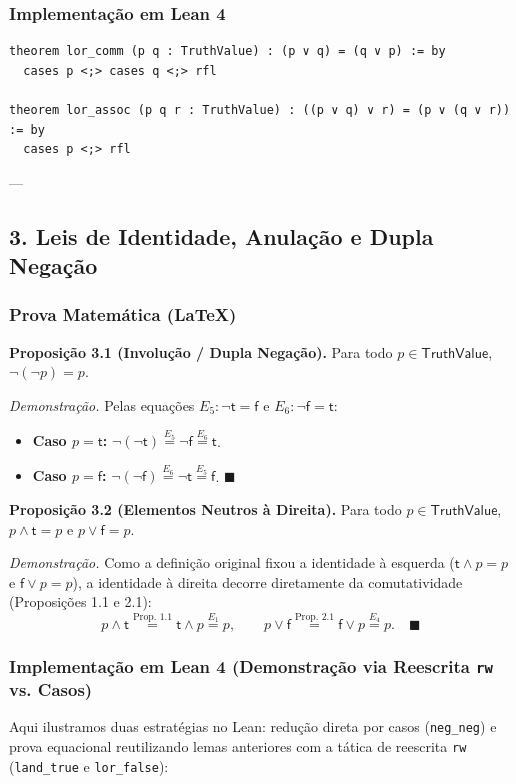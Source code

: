 \documentclass[11pt,a4paper]{scrartcl}
\begin{document}
\subsubsection{Implementação em Lean 4}
\label{sec:org64135f1}
\begin{lstlisting}[language=lean4,numbers=none]
theorem lor_comm (p q : TruthValue) : (p ∨ q) = (q ∨ p) := by
  cases p <;> cases q <;> rfl

theorem lor_assoc (p q r : TruthValue) : ((p ∨ q) ∨ r) = (p ∨ (q ∨ r)) := by
  cases p <;> rfl
\end{lstlisting}

---
\subsection{3. Leis de Identidade, Anulação e Dupla Negação}
\label{sec:orge64b958}

\subsubsection{Prova Matemática (\LaTeX{})}
\label{sec:org1387c06}
\textbf{Proposição 3.1 (Involução / Dupla Negação).} Para todo \(p \in \mathsf{TruthValue}\), \(\neg(\neg p) = p\).

\emph{Demonstração.} Pelas equações \(E_5: \neg \mathsf{t} = \mathsf{f}\) e \(E_6: \neg \mathsf{f} = \mathsf{t}\):
\begin{itemize}
\item \textbf{Caso \(p = \mathsf{t}\):} \(\neg(\neg \mathsf{t}) \stackrel{E_5}{=} \neg \mathsf{f} \stackrel{E_6}{=} \mathsf{t}\).
\item \textbf{Caso \(p = \mathsf{f}\):} \(\neg(\neg \mathsf{f}) \stackrel{E_6}{=} \neg \mathsf{t} \stackrel{E_5}{=} \mathsf{f}\). \(\blacksquare\)
\end{itemize}

\textbf{Proposição 3.2 (Elementos Neutros à Direita).} Para todo \(p \in \mathsf{TruthValue}\), \(p \land \mathsf{t} = p\) e \(p \lor \mathsf{f} = p\).

\emph{Demonstração.} Como a definição original fixou a identidade à esquerda (\(\mathsf{t} \land p = p\) e \(\mathsf{f} \lor p = p\)), a identidade à direita decorre diretamente da comutatividade (Proposições 1.1 e 2.1):
$$p \land \mathsf{t} \stackrel{\text{Prop. 1.1}}{=} \mathsf{t} \land p \stackrel{E_1}{=} p, \qquad p \lor \mathsf{f} \stackrel{\text{Prop. 2.1}}{=} \mathsf{f} \lor p \stackrel{E_4}{=} p. \quad \blacksquare$$
\subsubsection{Implementação em Lean 4 (Demonstração via Reescrita \texttt{rw} vs. Casos)}
\label{sec:orgcd41333}
Aqui ilustramos duas estratégias no Lean: redução direta por casos (\texttt{neg\_neg}) e prova equacional reutilizando lemas anteriores com a tática de reescrita \texttt{rw} (\texttt{land\_true} e \texttt{lor\_false}):
\end{document}

